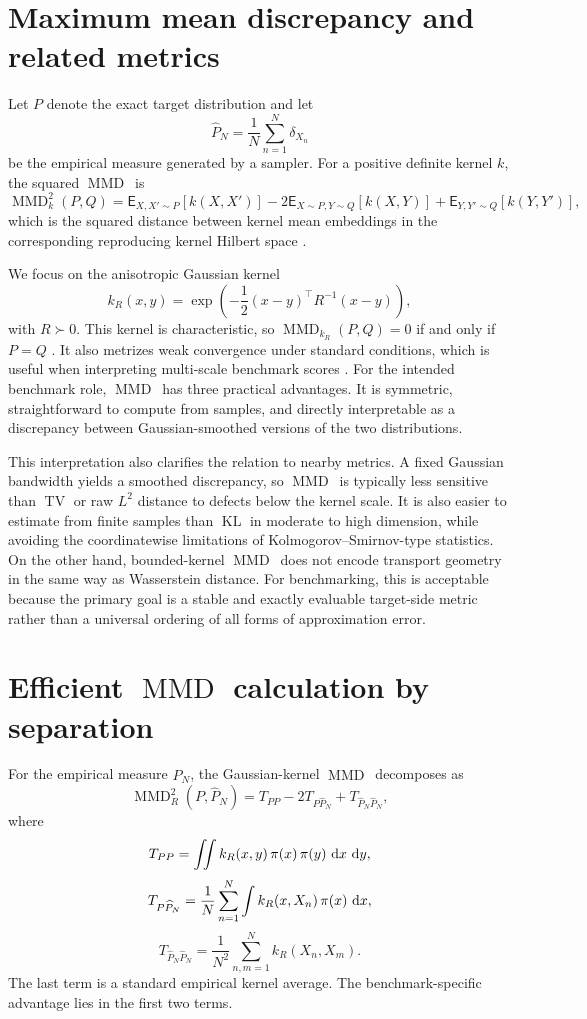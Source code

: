 \documentclass[11pt,a4paper]{article}
\def\d{\,{\rm d}}
\def \E{{\mathsf E}}
\DeclareMathOperator{\MMDop}{MMD}
\DeclareMathOperator{\KLop}{KL}
\DeclareMathOperator{\TVop}{TV}
\newcommand{\MMD}{\ensuremath{\MMDop}\xspace}
\newcommand{\KL}{\ensuremath{\KLop}\xspace}
\newcommand{\TV}{\ensuremath{\TVop}\xspace}
\begin{document}
\section{Maximum mean discrepancy and related metrics}

Let $P$ denote the exact target distribution and let
\[
\widehat P_N = \frac{1}{N}\sum_{n=1}^N \delta_{X_n}
\]
be the empirical measure generated by a sampler. For a positive definite kernel $k$, the squared \MMD\ is
\[
\MMD_k^2(P,Q)
=
\E_{X,X' \sim P}[k(X,X')]
- 2\E_{X \sim P, Y \sim Q}[k(X,Y)]
+ \E_{Y,Y' \sim Q}[k(Y,Y')],
\]
which is the squared distance between kernel mean embeddings in the corresponding reproducing kernel Hilbert space \parencite{Gretton2012,Sriperumbudur2010Hilbert}.

We focus on the anisotropic Gaussian kernel
\[
k_R(x,y)
=
\exp\!\left(-\frac{1}{2}(x-y)^\top R^{-1}(x-y)\right),
\]
with $R \succ 0$. This kernel is characteristic, so $\MMD_{k_R}(P,Q)=0$ if and only if $P=Q$ \parencite{Sriperumbudur2011Universality}. It also metrizes weak convergence under standard conditions, which is useful when interpreting multi-scale benchmark scores \parencite{SimonGabriel2020WeakMMD}. For the intended benchmark role, \MMD\ has three practical advantages. It is symmetric, straightforward to compute from samples, and directly interpretable as a discrepancy between Gaussian-smoothed versions of the two distributions.

This interpretation also clarifies the relation to nearby metrics. A fixed Gaussian bandwidth yields a smoothed discrepancy, so \MMD\ is typically less sensitive than $\TV$ or raw $L^2$ distance to defects below the kernel scale. It is also easier to estimate from finite samples than $\KL$ in moderate to high dimension, while avoiding the coordinatewise limitations of Kolmogorov--Smirnov-type statistics. On the other hand, bounded-kernel \MMD\ does not encode transport geometry in the same way as Wasserstein distance. For benchmarking, this is acceptable because the primary goal is a stable and exactly evaluable target-side metric rather than a universal ordering of all forms of approximation error.

\section{Efficient \texorpdfstring{\MMD}{MMD} calculation by separation}

For the empirical measure $\widehat P_N$, the Gaussian-kernel \MMD\ decomposes as
\[
\MMD_R^2(P,\widehat P_N) = T_{PP} - 2T_{P\widehat P_N} + T_{\widehat P_N\widehat P_N},
\]
where
\[
T_{PP} = \iint k_R(x,y)\,\pi(x)\,\pi(y)\,\d x\,\d y,
\]
\[
T_{P\widehat P_N} = \frac{1}{N}\sum_{n=1}^N \int k_R(x,X_n)\,\pi(x)\,\d x,
\]
\[
T_{\widehat P_N\widehat P_N} = \frac{1}{N^2}\sum_{n,m=1}^N k_R(X_n,X_m).
\]
The last term is a standard empirical kernel average. The benchmark-specific advantage lies in the first two terms.
\end{document}

